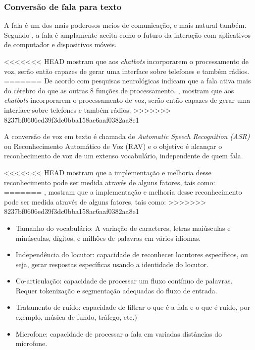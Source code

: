 \documentclass[
	12pt,				%
	oneside,
	a4paper,			%
	english,			%
	french,				%
	spanish,			%
	brazil				%
	]{abntex2}
\begin{document}
\subsubsection{Conversão de fala para texto}
A fala é um dos mais poderosos meios de comunicação, e mais natural também. Segundo \textcite{Abdul-Kader2015}, a fala é amplamente aceita como o futuro da interação com aplicativos de computador e dispositivos móveis.
 
<<<<<<< HEAD
\textcite{wired-for-speech} mostram que aos \emph{chatbots} incorporarem o processamento de voz, serão então capazes de gerar uma interface sobre telefones e também rádios.
=======
De acordo com pesquisas neurológicas indicam que a fala ativa mais do cérebro do que as outras 8 funções de processamento. \textcite{wired-for-speech}, mostram que aos \emph{chatbots} incorporarem o processamento de voz, serão então capazes de gerar uma interface sobre telefones e também rádios.
>>>>>>> 8237bf0606ed39f3dc0bba158ac6aaf0382aa8e1
 
A conversão de voz em texto é chamada de \emph{Automatic Speech Recognition (ASR)} ou Reconhecimento Automático de Voz (RAV) e o objetivo é alcançar o reconhecimento de voz de um extenso vocabulário, independente de quem fala.

<<<<<<< HEAD
\textcite{wired-for-speech-2} mostram que a implementação e melhoria desse reconhecimento pode ser medida através de alguns fatores, tais como:
=======
\textcite{wired-for-speech-2}, mostram que a implementação e melhoria desse reconhecimento pode ser medida através de alguns fatores, tais como:
>>>>>>> 8237bf0606ed39f3dc0bba158ac6aaf0382aa8e1

\begin{itemize}
	\item Tamanho do vocabulário: A variação de caracteres, letras maiúsculas e minúsculas, dígitos, e milhões de palavras em vários idiomas.
	\item Independência do locutor: capacidade de reconhecer locutores específicos, ou seja, gerar respostas específicas usando a identidade do locutor.
	\item Co-articulação: capacidade de processar um fluxo contínuo de palavras. Requer tokenização e segmentação adequadas do fluxo de entrada.
	\item Tratamento de ruído: capacidade de filtrar o que é a fala e o que é ruído, por exemplo, música de fundo, tráfego, etc.)
	\item Microfone: capacidade de processar a fala em variadas distâncias do microfone.
\end{itemize}
\end{document}
